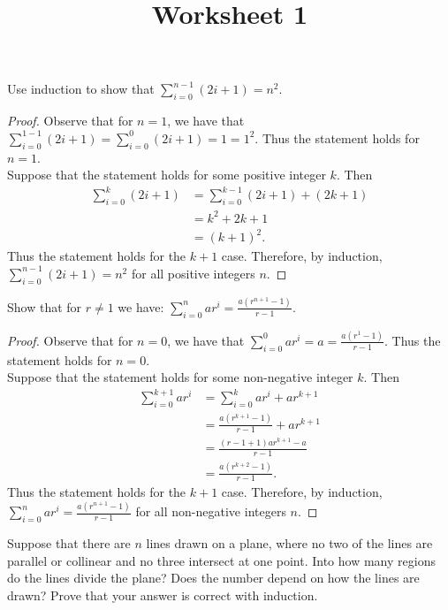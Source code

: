 \documentclass[class=article, crop=false]{standalone}
\title{Worksheet 1}
\begin{document}
  \maketitle
  \newpage
  \noindent
  \begin{problem}{1}
    Use induction to show that $\sum_{i=0}^{n-1}(2i+1) = n^2$.
  \end{problem}
  \begin{proof}
    Observe that for $n = 1$, we have that $\sum_{i=0}^{1-1}(2i+1) = \sum_{i=0}^{0}(2i+1) = 1 = 1^2$. Thus the statement holds for $n = 1$. \\
    Suppose that the statement holds for some positive integer $k$. Then
    \begin{align*}
      \sum_{i=0}^{k}(2i+1) &= \sum_{i=0}^{k-1}(2i+1) + (2k+1) \\
      &= k^2 + 2k + 1 \tag{Inductive Hypothesis} \\
      &= (k + 1)^2.
    \end{align*}
    Thus the statement holds for the $k + 1$ case. Therefore, by induction, $\sum_{i=0}^{n-1}(2i+1) = n^2$ for all positive integers $n$.
  \end{proof}
  \begin{problem}{2}
    Show that for $r \neq 1$ we have: $\sum_{i=0}^{n}ar^i = \frac{a(r^{n+1}-1)}{r-1}$.
  \end{problem}
  \begin{proof}
    Observe that for $n = 0$, we have that $\sum_{i=0}^{0}ar^i = a = \frac{a(r^1-1)}{r-1}$. Thus the statement holds for $n = 0$. \\
    Suppose that the statement holds for some non-negative integer $k$. Then
    \begin{align*}
      \sum_{i=0}^{k+1}ar^i &= \sum_{i=0}^{k}ar^i + ar^{k+1} \\
      &= \frac{a(r^{k+1}-1)}{r-1} + ar^{k+1} \tag{Inductive Hypothesis} \\
      &= \frac{(r-1+1)ar^{k+1}-a}{r-1} \\
      &= \frac{a(r^{k+2}-1)}{r-1}.
    \end{align*}
    Thus the statement holds for the $k + 1$ case. Therefore, by induction, $\sum_{i=0}^{n}ar^i = \frac{a(r^{n+1}-1)}{r-1}$ for all non-negative integers $n$.
  \end{proof}
  \begin{problem}{3}
    Suppose that there are $n$ lines drawn on a plane, where no two of the lines are parallel or collinear and no three intersect at one point. Into how many regions do the lines divide the plane? Does the number depend on how the lines are drawn? Prove that your answer is correct with induction.
  \end{problem}
\end{document}
